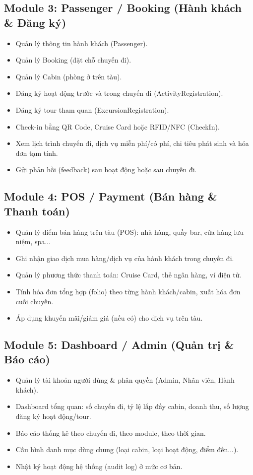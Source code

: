 \documentclass[a4paper,11pt]{article}
\begin{document}
\subsection{Module 3: Passenger / Booking (Hành khách \& Đăng ký)}

\begin{itemize}[leftmargin=1.2cm]
  \item Quản lý thông tin hành khách (Passenger).
  \item Quản lý Booking (đặt chỗ chuyến đi).
  \item Quản lý Cabin (phòng ở trên tàu).
  \item Đăng ký hoạt động trước và trong chuyến đi (ActivityRegistration).
  \item Đăng ký tour tham quan (ExcursionRegistration).
  \item Check-in bằng QR Code, Cruise Card hoặc RFID/NFC (CheckIn).
  \item Xem lịch trình chuyến đi, dịch vụ miễn phí/có phí, chi tiêu phát sinh và hóa đơn tạm tính.
  \item Gửi phản hồi (feedback) sau hoạt động hoặc sau chuyến đi.
\end{itemize}

\subsection{Module 4: POS / Payment (Bán hàng \& Thanh toán)}

\begin{itemize}[leftmargin=1.2cm]
  \item Quản lý điểm bán hàng trên tàu (POS): nhà hàng, quầy bar, cửa hàng lưu niệm, spa...
  \item Ghi nhận giao dịch mua hàng/dịch vụ của hành khách trong chuyến đi.
  \item Quản lý phương thức thanh toán: Cruise Card, thẻ ngân hàng, ví điện tử.
  \item Tính hóa đơn tổng hợp (folio) theo từng hành khách/cabin, xuất hóa đơn cuối chuyến.
  \item Áp dụng khuyến mãi/giảm giá (nếu có) cho dịch vụ trên tàu.
\end{itemize}

\subsection{Module 5: Dashboard / Admin (Quản trị \& Báo cáo)}

\begin{itemize}[leftmargin=1.2cm]
  \item Quản lý tài khoản người dùng \& phân quyền (Admin, Nhân viên, Hành khách).
  \item Dashboard tổng quan: số chuyến đi, tỷ lệ lấp đầy cabin, doanh thu, số lượng đăng ký hoạt động/tour.
  \item Báo cáo thống kê theo chuyến đi, theo module, theo thời gian.
  \item Cấu hình danh mục dùng chung (loại cabin, loại hoạt động, điểm đến...).
  \item Nhật ký hoạt động hệ thống (audit log) ở mức cơ bản.
\end{itemize}
\end{document}
